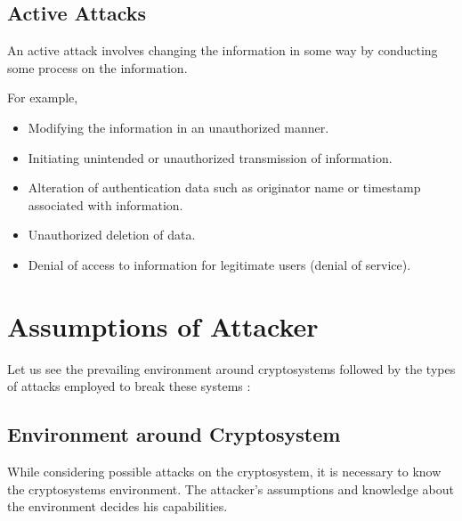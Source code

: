 \documentclass[british]{report}
\begin{document}
\subsection{Active Attacks}

An active attack involves changing the information in some way by
conducting some process on the information.

For example,
\begin{itemize}
	\item Modifying the information in an unauthorized manner.
	\item Initiating unintended or unauthorized transmission of information.
	\item Alteration of authentication data such as originator name or timestamp
	      associated with information.
	\item Unauthorized deletion of data.
	\item Denial of access to information for legitimate users (denial of service).
\end{itemize}

\section{Assumptions of Attacker}

Let us see the prevailing environment around cryptosystems followed
by the types of attacks employed to break these systems :

\subsection{Environment around Cryptosystem}

While considering possible attacks on the cryptosystem, it is necessary
to know the cryptosystems environment. The attacker's assumptions
and knowledge about the environment decides his capabilities.
\end{document}
